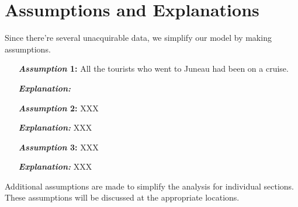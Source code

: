 \documentclass[12pt]{article}  %
\begin{document}
 
 \section{Assumptions and Explanations}
 
Since there're several unacquirable data, we simplify our model by making assumptions.
 
 \begin{itemize}
     \setlength{\parsep}{0ex} %
     \setlength{\topsep}{2ex} %
     \setlength{\itemsep}{1ex} %
     \item[\bfseries \textit{Assumption} 1:] All the tourists who went to Juneau had been on a cruise.
     \item[\bfseries \textit{Explanation:}]  
     \vspace{1ex}
     \item[\bfseries \textit{Assumption} 2:]  XXX
     \item[\bfseries \textit{Explanation:}]  XXX
     \vspace{1ex}
         \item[\bfseries \textit{Assumption} 3:]  XXX
     \item[\bfseries \textit{Explanation:}]  XXX
 \end{itemize}
 
 Additional assumptions are made to simplify the analysis for individual sections. These assumptions will be discussed at the appropriate locations.
 
\end{document}
